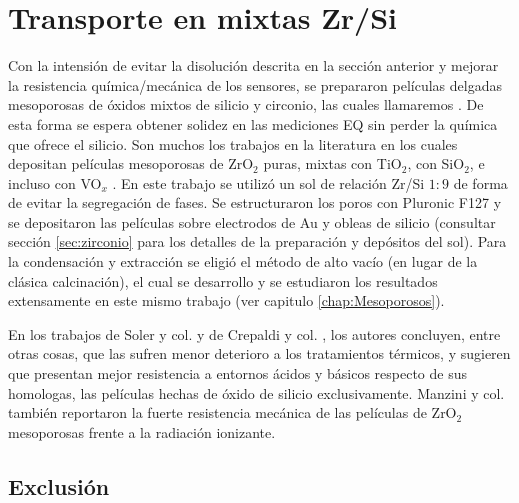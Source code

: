 

	\section{Transporte en \pdm\space mixtas Zr/Si}

			Con la intensión de evitar la disolución descrita en la sección anterior y mejorar la resistencia química/mecánica de los sensores, se prepararon películas delgadas mesoporosas de óxidos mixtos de silicio y circonio, las cuales llamaremos \pdmZ. De esta forma se espera obtener solidez en las mediciones EQ sin perder la química que ofrece el silicio. Son muchos los trabajos en la literatura en los cuales depositan películas mesoporosas de ZrO$_2$ puras, mixtas con TiO$_2$, con SiO$_2$, e incluso con VO$_x$ \cite{Soler-Illia2004,Crepaldi2002a,Gimenez2016,Zelcer2013,Calvo20210,Angelome2008}. En este trabajo se utilizó un sol de relación Zr/Si $1\!:\!9$ de forma de evitar la segregación de fases\cite{Soler-Illia2004}. Se estructuraron los poros con Pluronic F127 y se depositaron las películas sobre electrodos de Au y obleas de silicio (consultar sección \ref{sec:zirconio} para los detalles de la preparación y depósitos del sol). \marginpar{\color{red}{Falta agregar esto en Materiales}} Para la condensación y extracción se eligió el método de alto vacío (en lugar de la clásica calcinación), el cual se desarrollo y se estudiaron los resultados extensamente en este mismo trabajo (ver capitulo \ref{chap:Mesoporosos}).

			En los trabajos de Soler y col. y de Crepaldi y col. \cite{Soler-Illia2004,Crepaldi2002a}, los autores concluyen, entre otras cosas, que las \pdmZ\space sufren menor deterioro a los tratamientos térmicos, y sugieren que presentan mejor resistencia a entornos ácidos y básicos respecto de sus homologas, las películas hechas de óxido de silicio exclusivamente. Manzini y col.\cite{Gimenez2016} también reportaron la fuerte resistencia mecánica de las películas de ZrO$_2$ mesoporosas frente a la radiación ionizante.

	 \subsection{Exclusión}

